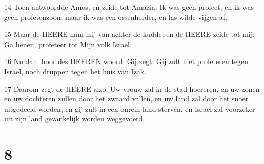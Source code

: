 \par 14 Toen antwoordde Amos, en zeide tot Amazia: Ik was geen profeet, en ik was geen profetenzoon; maar ik was een ossenherder, en las wilde vijgen af.
\par 15 Maar de HEERE nam mij van achter de kudde; en de HEERE zeide tot mij: Ga henen, profeteer tot Mijn volk Israel.
\par 16 Nu dan, hoor des HEEREN woord: Gij zegt: Gij zult niet profeteren tegen Israel, noch druppen tegen het huis van Izak.
\par 17 Daarom zegt de HEERE alzo: Uw vrouw zal in de stad hoereren, en uw zonen en uw dochteren zullen door het zwaard vallen, en uw land zal door het snoer uitgedeeld worden; en gij zult in een onrein land sterven, en Israel zal voorzeker uit zijn land gevankelijk worden weggevoerd.

\chapter{8}

